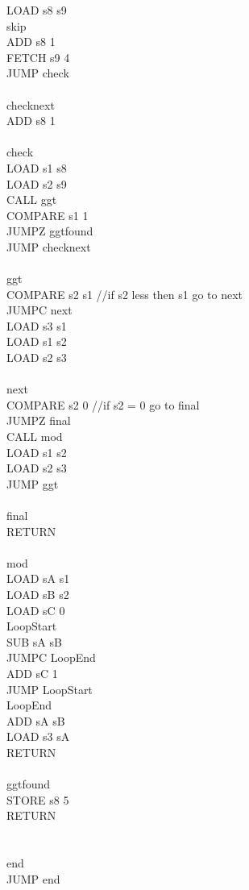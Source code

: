 \documentclass{scrartcl}
\begin{document}
\begin{multicols*}{2}
LOAD s8 s9\\
skip\\
ADD s8 1\\
FETCH s9 4\\
JUMP check\\
\\
checknext\\
ADD s8 1\\
\\
check\\
LOAD s1 s8\\
LOAD s2 s9\\
CALL ggt\\
COMPARE s1 1\\
JUMPZ ggtfound\\
JUMP checknext\\
\\
ggt\\
COMPARE s2 s1 //if s2 less then s1 go to next\\
JUMPC next\\
LOAD s3 s1\\
LOAD s1 s2\\
LOAD s2 s3\\
\\
next\\
COMPARE s2 0 //if s2 = 0 go to final\\
JUMPZ final\\
CALL mod\\
LOAD s1 s2\\
LOAD s2 s3\\
JUMP ggt\\
\\
final\\
RETURN\\
\\
mod\\
LOAD sA s1\\
LOAD sB s2\\
LOAD sC 0\\
LoopStart\\
SUB sA sB\\
JUMPC LoopEnd\\
ADD sC 1\\
JUMP LoopStart\\
LoopEnd\\
ADD sA sB\\
LOAD s3 sA\\
RETURN\\
\\
ggtfound\\
STORE s8 5\\
RETURN\\
\\
\\
end\\
JUMP end\\
\end{multicols*}
\end{document}
